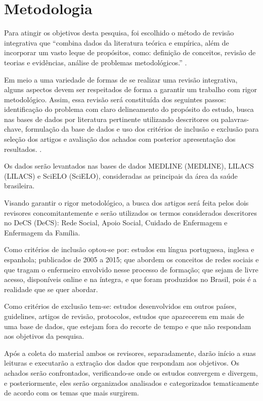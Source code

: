 \chapter{Metodologia}
\label{chap:metodologia}

Para atingir os objetivos desta pesquisa, foi escolhido o método de revisão integrativa que ``combina dados da literatura teórica e empírica, além de incorporar um vasto leque de propósitos, como: definição de conceitos, revisão de teorias e evidências, análise de problemas metodológicos.'' \cite[p. 04]{teixeira2014integrative}.

Em meio a uma variedade de formas de se realizar uma revisão integrativa, alguns aspectos devem ser respeitados de forma a garantir um trabalho com rigor metodológico. Assim, essa revisão será constituída dos seguintes passos: identificação do problema com claro delineamento do propósito do estudo, busca nas bases de dados por literatura pertinente utilizando descritores ou palavras-chave, formulação da base de dados e uso dos critérios de inclusão e exclusão para seleção dos artigos e avaliação dos achados com posterior apresentação dos resultados. \cite[p. 04]{teixeira2014integrative}.

Os dados serão levantados nas bases de dados \acrlong{MEDLINE} (\acrshort{MEDLINE}), \acrlong{LILACS} (\acrshort{LILACS}) e \acrlong{SciELO} (\acrshort{SciELO}), consideradas as principais da área da saúde brasileira. 

Visando garantir o rigor metodológico, a busca dos artigos será feita pelos dois revisores concomitantemente e serão utilizados os termos considerados descritores no \acrlong{DeCS} (\acrshort{DeCS}): Rede Social, Apoio Social, Cuidado de Enfermagem e Enfermagem da Família. 

Como critérios de inclusão optou-se por: estudos em língua portuguesa, inglesa e espanhola; publicados de 2005 a 2015; que abordem os conceitos de redes sociais e que tragam o enfermeiro envolvido nesse processo de formação; que sejam de livre acesso, disponíveis online e na íntegra, e que foram produzidos no Brasil, pois é a realidade que se quer abordar. 

Como critérios de exclusão tem-se: estudos desenvolvidos em outros países, guidelines, artigos de revisão, protocolos, estudos que aparecerem em mais de uma base de dados, que estejam fora do recorte de tempo e que não respondam aos objetivos da pesquisa. 

Após a coleta do material ambos os revisores, separadamente, darão início a suas leituras e executarão a extração dos dados que respondam aos objetivos. Os achados serão confrontados, verificando-se onde os estudos convergem e divergem, e posteriormente, eles serão organizados analisados e categorizados tematicamente de acordo com os temas que mais surgirem.  
